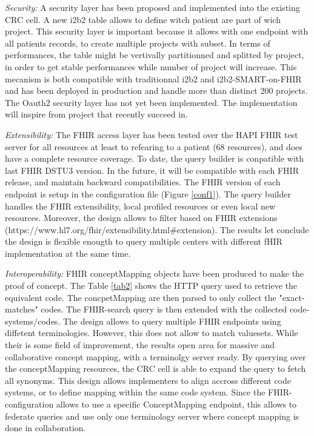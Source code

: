 \documentclass{amia}
\begin{document}
\textit{Security: }A security layer has been proposed and implemented into the existing CRC cell. A new i2b2 table allows to define witch patient are part of wich project. This security layer is important because it allows with one endpoint with all patients records, to create multiple projects with subset. In terms of performances, the table might be vertivally partitionned and splitted by project, in order to get stable performances while number of project will increase. This mecanism is both compatible with traditionnal i2b2 and i2b2-SMART-on-FHIR and has been deployed in production and handle more than distinct 200 projects.
The Oauth2 security layer has not yet been implemented. The implementation will inspire from project\cite{ref2,ref3} that recently succeed in.

\textit{Extensibility:} The FHIR access layer has been tested over the HAPI FHIR test server for all resources at least to refearing to a patient (68 resources), and does have a complete resource coverage. To date, the query builder is conpatible with last FHIR DSTU3 version. In the future, it will be compatible with each FHIR release, and maintain backward compatibilities. The FHIR version of each endpoint is setup in the configuration file (Figure \ref{conf1}). The query builder handles the FHIR extensibility, local profiled resources or even local new resources. Moreover, the design allows to filter based on FHIR extensions (https://www.hl7.org/fhir/extensibility.html\#extension). The results let conclude the design is flexible enougth to query multiple centers with different fHIR implementation at the same time.

\textit{Interoperability: }FHIR conceptMapping objects have been produced to make the proof of concept. The Table \ref{tab2} shows the HTTP query used to retrieve the equivalent code. The concpetMapping are then parsed to only collect the "exact-matches" codes. The FHIR-search query is then extended with the collected code-systems/codes. The design allows to query multiple FHIR endpoints using diffetent terminologies. However, this does not allow to match valuesets. While their is some field of improvement, the results open area for massive and collaborative concept mapping, with a terminolgy server ready.
By querying over the conceptMapping resources, the CRC cell is able to expand the query to fetch all synonyms. This design allows implementers to align accross different code systems, or to define mapping within the same code system. Since the FHIR-configuration allows to use a specific ConceptMapping endpoint, this allows to federate queries and use only one terminology server where concept mapping is done in collaboration.
\end{document}
